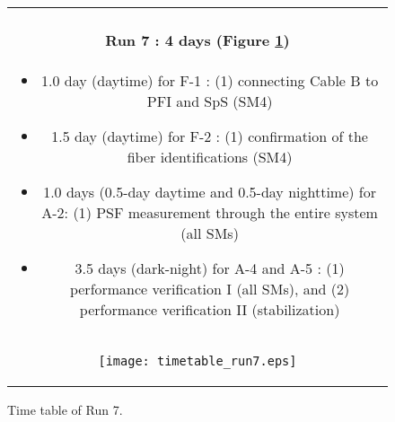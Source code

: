 \begin{figure}[!ht]
\begin{center}
\begin{tabular}{c}
\begin{minipage}{0.95\hsize}
\paragraph{Run 7 : 4 days  (Figure \ref{fig:run7})}
	\begin{itemize}
	\item 1.0 day (daytime) for F-1 :  
	(1) connecting Cable B to PFI and SpS (SM4)
	\item 1.5 day (daytime) for F-2 :  
	(1) confirmation of  the fiber identifications (SM4)
	\item 1.0 days (0.5-day daytime and 0.5-day nighttime) for A-2: 
	(1) PSF measurement through the entire system (all SMs)
	\item 3.5 days (dark-night) for A-4 and A-5 : 
	(1) performance verification I (all SMs),  and
	(2) performance verification II (stabilization)
	\end{itemize}
\end{minipage} \\
\begin{minipage}{0.8\hsize}
	\begin{center}
	\vspace*{5mm}
	\texttt{[image: timetable\_run7.eps]}
	\end{center}
	\vspace*{-5mm}
	\caption{Time table of Run 7.}
	\label{fig:run7}
\end{minipage}
\end{tabular}
\end{center}
\end{figure}

